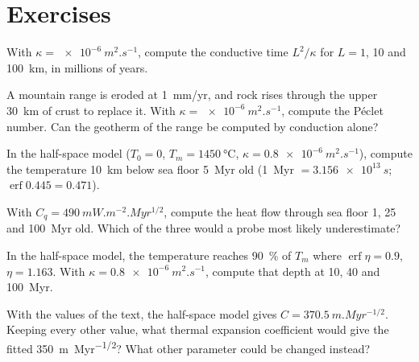 \section{Exercises}

\begin{exercise}[$\star$]\label{exo:b3:lithosphere-thermal-models:1}
With $\kappa = \qty{e-6}{m^2.s^{-1}}$, compute the conductive time $L^2/\kappa$
for $L = 1$, 10 and \qty{100}{km}, in millions of years.
\end{exercise}

\begin{exercise}[$\star$]\label{exo:b3:lithosphere-thermal-models:2}
A mountain range is eroded at \qty{1}{mm/yr}, and rock rises through the upper
\qty{30}{km} of crust to replace it. With $\kappa = \qty{e-6}{m^2.s^{-1}}$,
compute the Péclet number. Can the geotherm of the range be computed by
conduction alone?
\end{exercise}

\begin{exercise}[$\star$]\label{exo:b3:lithosphere-thermal-models:3}
In the half-space model ($T_0 = 0$, $T_m = \qty{1450}{\celsius}$, $\kappa =
\qty{0.8e-6}{m^2.s^{-1}}$), compute the temperature \qty{10}{km} below sea
floor \qty{5}{Myr} old (\qty{1}{Myr} $= \qty{3.156e13}{s}$; $\operatorname{erf}
0.445 = 0.471$).
\end{exercise}

\begin{exercise}[$\star$]\label{exo:b3:lithosphere-thermal-models:4}
With $C_q = \qty{490}{mW.m^{-2}.Myr^{1/2}}$, compute the heat flow through
sea floor 1, 25 and \qty{100}{Myr} old. Which of the three would a probe most
likely underestimate?
\end{exercise}

\begin{exercise}[$\star\star$]\label{exo:b3:lithosphere-thermal-models:5}
In the half-space model, the temperature reaches \qty{90}{\percent} of $T_m$
where $\operatorname{erf}\eta = 0.9$, $\eta = 1.163$. With $\kappa =
\qty{0.8e-6}{m^2.s^{-1}}$, compute that depth at 10, 40 and \qty{100}{Myr}.
\end{exercise}

\begin{exercise}[$\star\star$]\label{exo:b3:lithosphere-thermal-models:6}
With the values of the text, the half-space model gives $C =
\qty{370.5}{m.Myr^{-1/2}}$. Keeping every other value, what thermal expansion
coefficient would give the fitted \qty{350}{m.Myr^{-1/2}}? What other parameter
could be changed instead?
\end{exercise}

